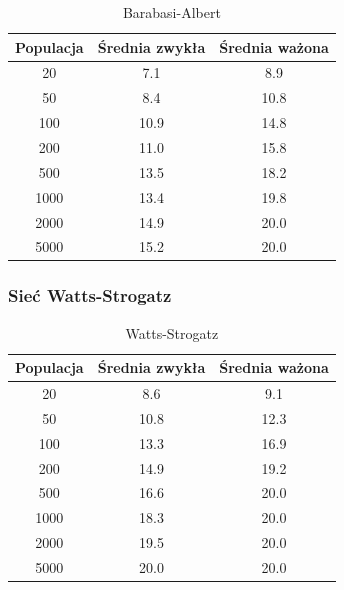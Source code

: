 \documentclass{wfiisul}
\begin{document}
\begin{table}[htbp]
  \centering
  \begin{tabular}{c|c|c}
    \hline
    Populacja & Średnia zwykła & Średnia ważona \\
    \hline
    20        & 7.1            & 8.9            \\
    50        & 8.4            & 10.8           \\
    100       & 10.9           & 14.8           \\
    200       & 11.0           & 15.8           \\
    500       & 13.5           & 18.2           \\
    1000      & 13.4           & 19.8           \\
    2000      & 14.9           & 20.0           \\
    5000      & 15.2           & 20.0           \\
  \end{tabular}
  \caption{Barabasi-Albert}
  \label{tab:barabasi_albert}
\end{table}

\subsubsection{Sieć Watts-Strogatz}

\begin{table}[htbp]
  \centering
  \begin{tabular}{c|c|c}
    \hline
    Populacja & Średnia zwykła & Średnia ważona \\
    \hline
    20        & 8.6            & 9.1            \\
    50        & 10.8           & 12.3           \\
    100       & 13.3           & 16.9           \\
    200       & 14.9           & 19.2           \\
    500       & 16.6           & 20.0           \\
    1000      & 18.3           & 20.0           \\
    2000      & 19.5           & 20.0           \\
    5000      & 20.0           & 20.0           \\
  \end{tabular}
  \caption{Watts-Strogatz}
  \label{tab:watts_strogatz}
\end{table}
\end{document}
